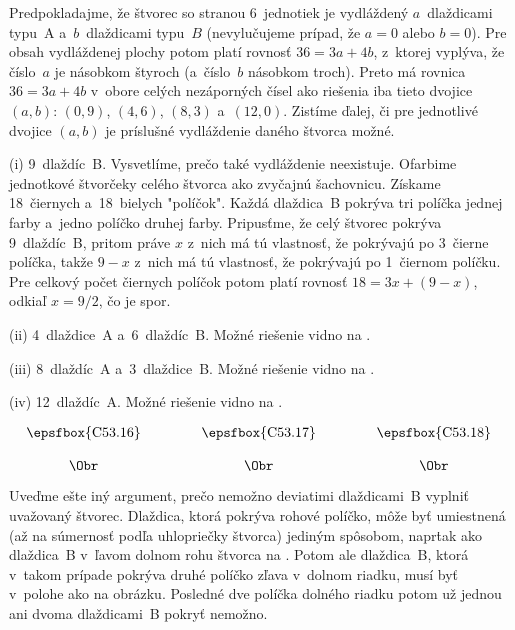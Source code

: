 {%
Predpokladajme, že štvorec so stranou 6~jednotiek je vydláždený
$a$~dlaždicami typu~A a~$b$~dlaždicami typu~$B$ (nevylučujeme prípad, že
$a=0$ alebo $b=0$). Pre obsah vydláždenej plochy potom platí
rovnosť $36=3a+4b$, z~ktorej vyplýva, že číslo~$a$ je násobkom štyroch
(a~číslo~$b$ násobkom troch). Preto má rovnica $36=3a+4b$ v~obore
celých nezáporných čísel ako riešenia iba tieto dvojice $(a,b)$:
$(0,9)$, $(4,6)$, $(8,3)$ a~$(12,0)$. Zistíme ďalej,
či pre jednotlivé dvojice $(a,b)$ je príslušné
vydláždenie daného štvorca možné. %

\ite (i) 9~dlaždíc~B. Vysvetlíme, prečo také vydláždenie
neexistuje. Ofarbime jednotkové štvorčeky celého štvorca ako
zvyčajnú šachovnicu. Získame 18~čiernych a~18~bielych "políčok".
Každá dlaždica~B pokrýva tri políčka jednej farby a~jedno políčko druhej
farby. Pripusťme, že celý štvorec pokrýva 9~dlaždíc~B, pritom
práve $x$ z~nich má tú vlastnosť, že pokrývajú po 3~čierne
políčka, takže $9-x$ z~nich má tú vlastnosť, že pokrývajú po
1~čiernom políčku. Pre celkový počet čiernych políčok potom platí rovnosť
$18=3x+(9-x)$, odkiaľ $x=9/2$, čo je spor.

\ite (ii) 4~dlaždice~A a~6~dlaždíc~B. Možné riešenie vidno na
\obr.

\ite (iii) 8~dlaždíc~A a~3~dlaždice~B. Možné riešenie vidno na
\obr.

\ite (iv) 12~dlaždíc~A. Možné riešenie vidno na \obr.

$$
\vbox{\halign{# \qquad&\qquad # \qquad&\qquad # \cr
\hfil\hbox{\epsfbox{C53.16}}\hfil & \hfil\hbox{\epsfbox{C53.17}}\hfil & \hfil\hbox{\epsfbox{C53.18}}\hfil \cr
 &&\cr
 \hfil\Obr\hfil & \hfil\Obr\hfil & \hfil\Obr\hfil  \cr}}
$$

\poznamka
Uveďme ešte iný argument, prečo nemožno deviatimi
dlaždicami~B vyplniť uvažovaný štvorec. Dlaždica, ktorá pokrýva
rohové políčko, môže byť umiestnená (až na súmernosť podľa uhlopriečky
štvorca) jediným spôsobom, napr\. tak ako dlaždica~B v~ľavom
dolnom rohu štvorca na . Potom ale dlaždica~B, ktorá
v~takom prípade pokrýva druhé políčko zľava v~dolnom riadku, musí byť
v~polohe ako na obrázku. Posledné dve políčka dolného riadku potom už
jednou ani dvoma dlaždicami~B pokryť nemožno.}

